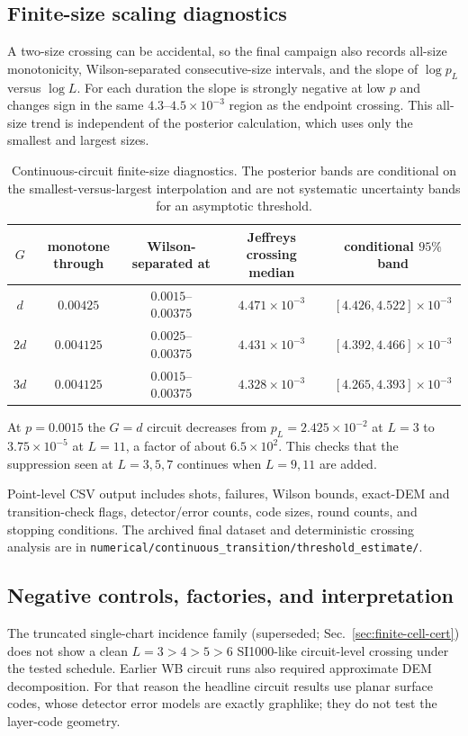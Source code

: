 \documentclass[aps,prx,reprint,superscriptaddress,nofootinbib,floatfix,longbibliography]{revtex4-2}
\theoremstyle{definition}
\begin{document}
\subsection{Finite-size scaling diagnostics}
A two-size crossing can be accidental, so the final campaign also records all-size monotonicity, Wilson-separated consecutive-size intervals, and the slope of $\log p_L$ versus $\log L$.  For each duration the slope is strongly negative at low $p$ and changes sign in the same $4.3$--$4.5\times10^{-3}$ region as the endpoint crossing.  This all-size trend is independent of the posterior calculation, which uses only the smallest and largest sizes.

\begin{table}[t]
\caption{Continuous-circuit finite-size diagnostics.  The posterior bands are conditional on the smallest-versus-largest interpolation and are not systematic uncertainty bands for an asymptotic threshold.}
\label{tab:supp-continuous-crossing}
\scriptsize
\setlength{\tabcolsep}{4pt}
\begin{tabular}{c c c c c}
\toprule
$G$ & monotone through & Wilson-separated at & Jeffreys crossing median & conditional $95\%$ band\\\midrule
$d$  & $0.00425$  & $0.0015$--$0.00375$ & $4.471\times10^{-3}$ & $[4.426,4.522]\times10^{-3}$\\
$2d$ & $0.004125$ & $0.0025$--$0.00375$ & $4.431\times10^{-3}$ & $[4.392,4.466]\times10^{-3}$\\
$3d$ & $0.004125$ & $0.0015$--$0.00375$ & $4.328\times10^{-3}$ & $[4.265,4.393]\times10^{-3}$\\
\bottomrule
\end{tabular}
\end{table}

At $p=0.0015$ the $G=d$ circuit decreases from $p_L=2.425\times10^{-2}$ at $L=3$ to $3.75\times10^{-5}$ at $L=11$, a factor of about $6.5\times10^2$.  This checks that the suppression seen at $L=3,5,7$ continues when $L=9,11$ are added.

Point-level CSV output includes shots, failures, Wilson bounds, exact-DEM and transition-check flags, detector/error counts, code sizes, round counts, and stopping conditions.  The archived final dataset and deterministic crossing analysis are in \nolinkurl{numerical/continuous_transition/threshold_estimate/}.

\subsection{Negative controls, factories, and interpretation}\label{sec:supp-negative}
The truncated single-chart incidence family (superseded; Sec.~\ref{sec:finite-cell-cert}) does not show a clean $L=3>4>5>6$ SI1000-like circuit-level crossing under the tested schedule.  Earlier WB circuit runs also required approximate DEM decomposition.  For that reason the headline circuit results use planar surface codes, whose detector error models are exactly graphlike; they do not test the layer-code geometry.
\end{document}
